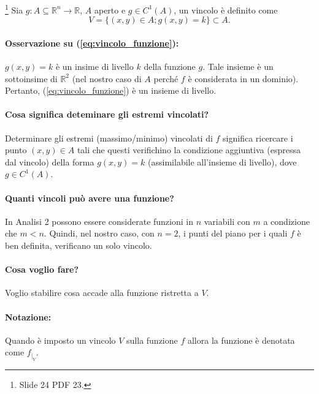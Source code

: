 \begin{definition}[Vincolo]\footnote{Slide 24 PDF 23.}
	Sia $g:A\subseteq\mathbb{R}^n\rightarrow\mathbb{R}$, $A$ aperto e $g\in C^1(A)$, un vincolo è definito come
	\begin{equation}\label{eq:vincolo_funzione}
		V = \{(x,y)\in A; g(x,y)=k\}\subset A.
	\end{equation}
\end{definition}

\paragraph{Osservazione su (\ref{eq:vincolo_funzione}):} $g(x,y)=k$ è un insime di livello $k$ della funzione $g$. Tale insieme è un sottoinsime di $\mathbb{R}^2$ (nel nostro caso di $A$ perché $f$ è considerata in un dominio). Pertanto, (\ref{eq:vincolo_funzione}) è un insieme di livello.

\paragraph{Cosa significa deteminare gli estremi vincolati?} Determinare gli estremi (massimo/minimo) vincolati di $f$ significa ricercare i punto $(x,y)\in A$ tali che questi verifichino la condizione aggiuntiva (espressa dal vincolo) della forma $g(x,y)=k$ (assimilabile all'insieme di livello), dove $g\in C^1(A)$.

\paragraph{Quanti vincoli può avere una funzione?} In Analisi 2 possono essere considerate funzioni in $n$ variabili con $m$ a condizione che $m<n$. Quindi, nel nostro caso, con $n=2$, i punti del piano per i quali $f$ è ben definita, verificano un solo vincolo.

\paragraph{Cosa voglio fare?} Voglio stabilire cosa accade alla funzione ristretta a $V$.

\paragraph{Notazione:} Quando è imposto un vincolo $V$ sulla funzione $f$ allora la funzione è denotata come $f_{|_V}$.

